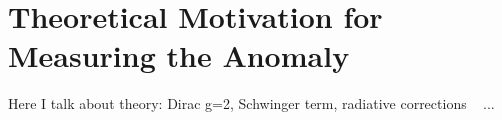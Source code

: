 \section{Theoretical Motivation for Measuring the Anomaly}

Here I talk about theory: Dirac g=2, Schwinger term, radiative corrections  ~\cite{Doug} ... \\

